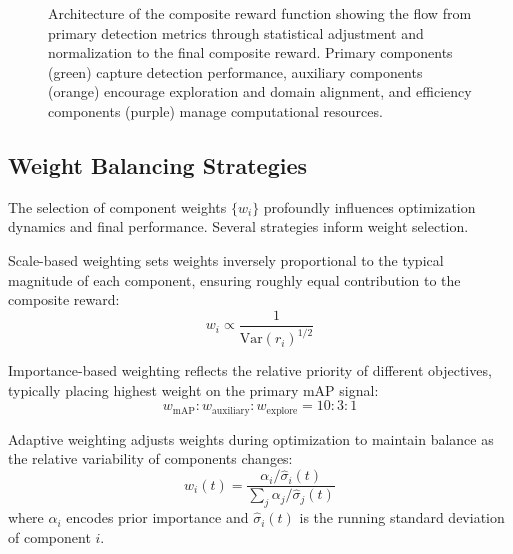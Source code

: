 \begin{figure}[t]
\caption{Architecture of the composite reward function showing the flow from primary detection metrics through statistical adjustment and normalization to the final composite reward. Primary components (green) capture detection performance, auxiliary components (orange) encourage exploration and domain alignment, and efficiency components (purple) manage computational resources.}
\label{fig:reward_architecture}
\end{figure}

\subsection{Weight Balancing Strategies}

The selection of component weights $\{w_i\}$ profoundly influences optimization dynamics and final performance. Several strategies inform weight selection.

Scale-based weighting sets weights inversely proportional to the typical magnitude of each component, ensuring roughly equal contribution to the composite reward:
\begin{equation}
w_i \propto \frac{1}{\text{Var}(r_i)^{1/2}}
\label{eq:scale_based_weights}
\end{equation}

Importance-based weighting reflects the relative priority of different objectives, typically placing highest weight on the primary mAP signal:
\begin{equation}
w_{\text{mAP}} : w_{\text{auxiliary}} : w_{\text{explore}} = 10 : 3 : 1
\label{eq:importance_weights}
\end{equation}

Adaptive weighting adjusts weights during optimization to maintain balance as the relative variability of components changes:
\begin{equation}
w_i(t) = \frac{\alpha_i / \hat{\sigma}_i(t)}{\sum_j \alpha_j / \hat{\sigma}_j(t)}
\label{eq:adaptive_weights}
\end{equation}
where $\alpha_i$ encodes prior importance and $\hat{\sigma}_i(t)$ is the running standard deviation of component $i$.

